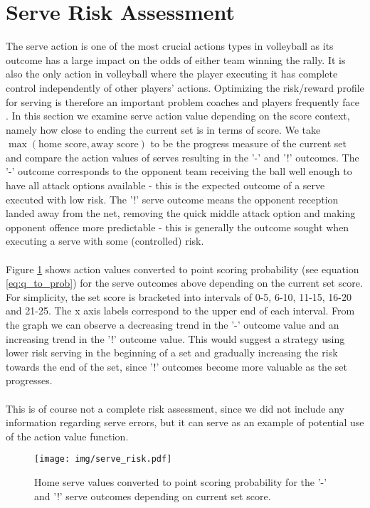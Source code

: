 \documentclass{sfuthesis}
\begin{document}
	\section{Serve Risk Assessment}
	The serve action is one of the most crucial actions types in volleyball as its outcome has a large impact on the odds of either team winning the rally. It is also the only action in volleyball where the player executing it has complete control independently of other players' actions. Optimizing the risk/reward profile for serving is therefore an important problem coaches and players frequently face \cite{burton2015linear}. In this section we examine serve action value depending on the score context, namely how close to ending the current set is in terms of score. We take $\max(\text{home score}, \text{away score})$ to be the progress measure of the current set and compare the action values of serves resulting in the '-' and '!' outcomes. The '-' outcome corresponds to the opponent team receiving the ball well enough to have all attack options available - this is the expected outcome of a serve executed with low risk. The '!' serve outcome means the opponent reception landed away from the net, removing the quick middle attack option and making opponent offence more predictable - this is generally the outcome sought when executing a serve with some (controlled) risk.\\\\
	Figure \ref{fig:serve-risk} shows action values converted to point scoring probability (see equation \eqref{eq:q_to_prob}) for the serve outcomes above depending on the current set score. For simplicity, the set score is bracketed into intervals of 0-5, 6-10, 11-15, 16-20 and 21-25. The x axis labels correspond to the upper end of each interval. From the graph we can observe a decreasing trend in the '-' outcome value and an increasing trend in the '!' outcome value. This would suggest a strategy using lower risk serving in the beginning of a set and gradually increasing the risk towards the end of the set, since '!' outcomes become more valuable as the set progresses.\\\\
	This is of course not a complete risk assessment, since we did not include any information regarding serve errors, but it can serve as an example of potential use of the action value function.
	
	\begin{figure}
		\centering
		\texttt{[image: img/serve\_risk.pdf]}
		\caption{Home serve values converted to point scoring probability for the '-' and '!' serve outcomes depending on current set score.}
		\label{fig:serve-risk}
	\end{figure}
	
\end{document}
